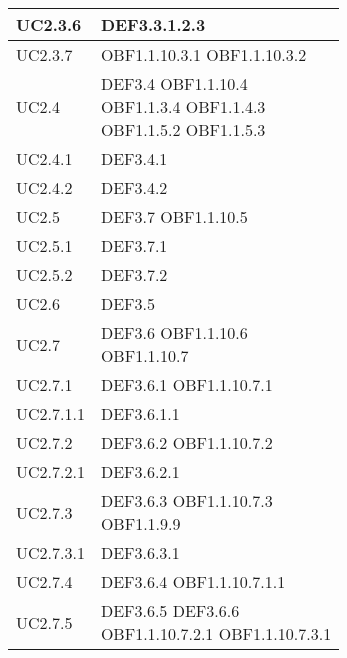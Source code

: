 \documentclass{scalatekids-article}
\begin{document}
\begin{longtable}[H]{|p{5.5cm}|p{5.5cm}|}
\hline
UC2.3.6 & \multiLineCell[t]{DEF3.3.1.2.3\\}\\
\hline
UC2.3.7 & \multiLineCell[t]{OBF1.1.10.3.1 OBF1.1.10.3.2\\}\\
\hline
UC2.4 & \multiLineCell[t]{DEF3.4 OBF1.1.10.4\\OBF1.1.3.4 OBF1.1.4.3\\OBF1.1.5.2 OBF1.1.5.3\\}\\
\hline
UC2.4.1 & \multiLineCell[t]{DEF3.4.1\\}\\
\hline
UC2.4.2 & \multiLineCell[t]{DEF3.4.2\\}\\
\hline
UC2.5 & \multiLineCell[t]{DEF3.7 OBF1.1.10.5\\}\\
\hline
UC2.5.1 & \multiLineCell[t]{DEF3.7.1\\}\\
\hline
UC2.5.2 & \multiLineCell[t]{DEF3.7.2\\}\\
\hline
UC2.6 & \multiLineCell[t]{DEF3.5\\}\\
\hline
UC2.7 & \multiLineCell[t]{DEF3.6 OBF1.1.10.6\\OBF1.1.10.7\\}\\
\hline
UC2.7.1 & \multiLineCell[t]{DEF3.6.1 OBF1.1.10.7.1\\}\\
\hline
UC2.7.1.1 & \multiLineCell[t]{DEF3.6.1.1\\}\\
\hline
UC2.7.2 & \multiLineCell[t]{DEF3.6.2 OBF1.1.10.7.2\\}\\
\hline
UC2.7.2.1 & \multiLineCell[t]{DEF3.6.2.1\\}\\
\hline
UC2.7.3 & \multiLineCell[t]{DEF3.6.3 OBF1.1.10.7.3\\OBF1.1.9.9}\\
\hline
UC2.7.3.1 & \multiLineCell[t]{DEF3.6.3.1\\}\\
\hline
UC2.7.4 & \multiLineCell[t]{DEF3.6.4 OBF1.1.10.7.1.1\\}\\
\hline
UC2.7.5 & \multiLineCell[t]{DEF3.6.5 DEF3.6.6\\OBF1.1.10.7.2.1 OBF1.1.10.7.3.1\\}\\

\end{longtable}
\end{document}
